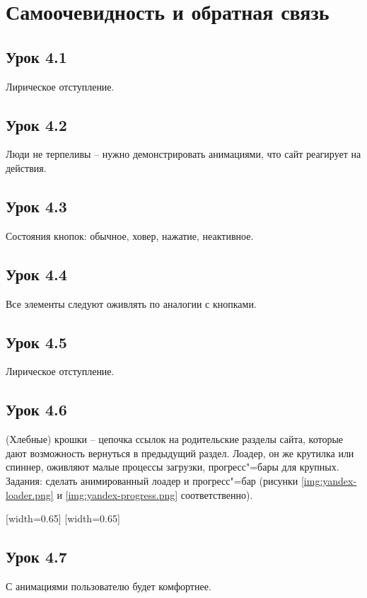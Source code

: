 \documentclass[variant=practice]{bsuir}
\begin{document}
\section{Самоочевидность и обратная связь}

\subsection{Урок 4.1} Лирическое отступление.

\subsection{Урок 4.2} Люди не терпеливы -- нужно демонстрировать анимациями, что
сайт реагирует на действия.

\subsection{Урок 4.3} Состояния кнопок: обычное, ховер, нажатие, неактивное.

\subsection{Урок 4.4} Все элементы следуют оживлять по аналогии с кнопками.

\subsection{Урок 4.5} Лирическое отступление.

\subsection{Урок 4.6} (Хлебные) крошки -- цепочка ссылок на родительские разделы
сайта, которые дают возможность вернуться в предыдущий раздел. Лоадер, он же
крутилка или спиннер, оживляют малые процессы загрузки, прогресс"=бары для
крупных. Задания: сделать анимированный лоадер и прогресс"=бар (рисунки
\ref{img:yandex-loader.png} и \ref{img:yandex-progress.png} соответственно).

[width=0.65\textwidth]
[width=0.65\textwidth]

\subsection{Урок 4.7} С анимациями пользователю будет комфортнее.
\end{document}
